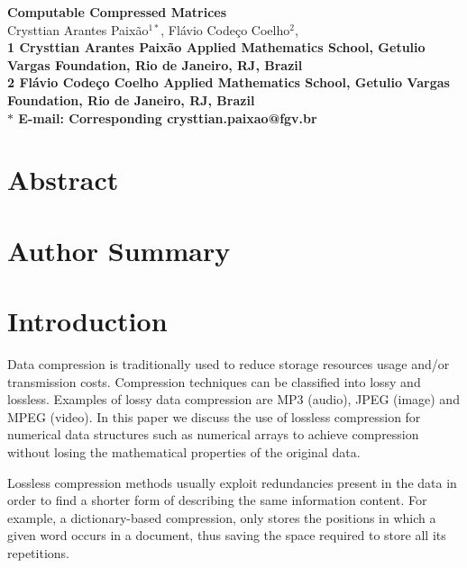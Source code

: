 \documentclass[10pt]{article}
\date{}
\begin{document}
\begin{flushleft}
{\Large
\textbf{Computable Compressed Matrices}
}
\\
Crysttian Arantes Paix\~{a}o$^{1\ast}$, 
Fl\'{a}vio Code\c{c}o Coelho$^{2}$, 
\\
\bf{1} Crysttian Arantes Paix\~{a}o Applied Mathematics School, Getulio Vargas Foundation, Rio de Janeiro, RJ, Brazil
\\
\bf{2} Fl\'{a}vio Code\c{c}o Coelho Applied Mathematics School, Getulio Vargas Foundation, Rio de Janeiro, RJ, Brazil
\\
$\ast$ E-mail: Corresponding crysttian.paixao@fgv.br
\end{flushleft}

\section*{Abstract}

\section*{Author Summary}

\section*{Introduction}

Data compression is traditionally used to reduce storage resources usage and/or transmission costs\cite{salomon}. Compression techniques can be classified into lossy and lossless. Examples of lossy data compression are MP3 (audio), JPEG (image) and MPEG (video). In this paper we discuss the use of lossless compression for numerical data structures such as numerical arrays to achieve compression without losing the mathematical properties of the original data.  

Lossless compression methods usually exploit redundancies present in the data in order to find a shorter form of describing the same information content. For example, a dictionary-based compression, only stores the positions in which a given word occurs in a document, thus saving the space required to store all its repetitions\cite{salomon2}. 
\end{document}
